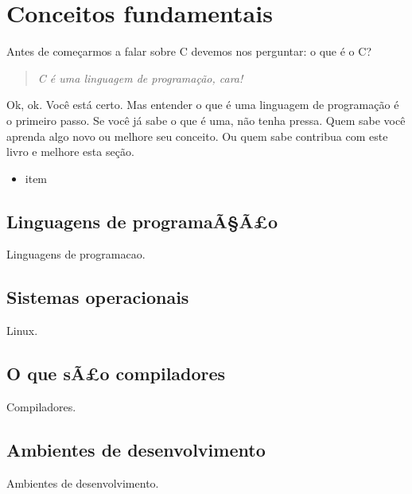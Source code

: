

\chapter{Conceitos fundamentais}
Antes de começarmos a falar sobre C devemos nos perguntar: o que é o C?
\begin{quote}
\textit{C é uma linguagem de programação, cara!}
\end{quote}

Ok, ok. Você está certo. Mas entender o que é uma linguagem de programação é o primeiro passo. Se você já sabe o que é uma, não tenha pressa. Quem sabe você aprenda algo novo ou melhore seu conceito. Ou quem sabe contribua com este livro e melhore esta seção.

\begin{itemize}
  \item item
\end{itemize}

\section{Linguagens de programaÃ§Ã£o}

Linguagens de programacao.


\section{Sistemas operacionais}

Linux.


\section{O que sÃ£o compiladores}

Compiladores.


\section{Ambientes de desenvolvimento}

Ambientes de desenvolvimento.


